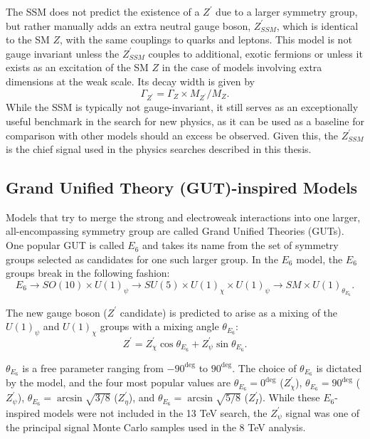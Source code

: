 The SSM does not predict the existence of a $Z^{\prime}$ due to a larger symmetry group, but rather manually adds an extra neutral gauge boson, $Z^{\prime}_{SSM}$, which is identical to the SM $Z$, with the same couplings to quarks and leptons. This model is not gauge invariant unless the $Z^{\prime}_{SSM}$ couples to additional, exotic fermions or unless it exists as an excitation of the SM $Z$ in the case of models involving extra dimensions at the weak scale. Its decay width is given by 
\begin{equation}
\Gamma_{Z^{\prime}} = \Gamma_Z \times M_{Z^{\prime}}/M_{Z}.
\end{equation}
\noindent While the SSM is typically not gauge-invariant, it still serves as an exceptionally useful benchmark in the search for new physics, as it can be used as a baseline for comparison with other models should an excess be observed.\cite{SSM} Given this, the $Z^{\prime}_{SSM}$ is the chief signal used in the physics searches described in this thesis. 

\subsection{Grand Unified Theory (GUT)-inspired Models}

Models that try to merge the strong and electroweak interactions into one larger, all-encompassing symmetry group are called Grand Unified Theories (GUTs). One popular GUT is called $E_6$ and takes its name from the set of symmetry groups selected as candidates for one such larger group. In the $E_6$ model, the $E_6$ groups break in the following fashion:
\begin{equation}
E_6 \to SO(10) \times U(1)_\psi \to SU(5) \times U(1)_\chi \times U(1)_\psi \to SM \times U(1)_{\theta_{E_6}}.
\end{equation}

\noindent The new gauge boson ($Z^\prime$ candidate) is predicted to arise as a mixing of the $U(1)_\psi$ and $U(1)_\chi$ groups with a mixing angle $\theta_{E_6}$:
\begin{equation}
Z^{\prime} = Z^\prime_\chi \cos{\theta_{E_6}} + Z^\prime_\psi \sin{\theta_{E_6}}.
\end{equation}

\noindent$\theta_{E_6}$ is a free parameter ranging from $-90^{\deg}$ to $90^{\deg}$. The choice of $\theta_{E_6}$ is dictated by the model, and the four most popular values are $\theta_{E_6} = 0^{\deg}$ ($Z^\prime_\chi$), $\theta_{E_6} = 90^{\deg}$ ($Z^\prime_\psi$), $\theta_{E_6} = \arcsin{\sqrt{3/8}}$ ($Z^\prime_\eta$), and $\theta_{E_6} = \arcsin{\sqrt{5/8}}$ ($Z^\prime_I$).\cite{E6} While these $E_6$-inspired models were not included in the 13 TeV search, the $Z^\prime_\psi$ signal was one of the principal signal Monte Carlo samples used in the 8 TeV analysis.